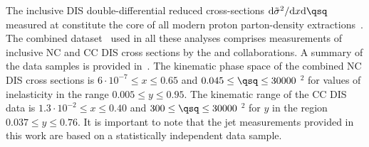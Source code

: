 The inclusive DIS double-differential reduced cross-sections $\mathrm{d}\tilde\sigma^2/\mathrm{d}x\mathrm{d}\qsq$ measured at \hera constitute the core of all modern proton parton-density extractions~\cite{Lai:2010vv,Martin:2009iq,Alekhin:2012ig,Ball:2011uy,Aaron:2009aa}. The combined dataset~\cite{Aaron:2009aa} used in all these analyses comprises measurements of inclusive NC and CC DIS cross sections by the \hone and \zeus collaborations. A summary of the data samples is provided in~\cite{Aaron:2009aa}. The kinematic phase space of the combined NC DIS cross sections is $6\cdot 10^{-7} \le x \le 0.65$ and $0.045 \le \qsq \le 30000$ \GeV$^2$ for values of inelasticity in the range $0.005 \le y \le 0.95$. The kinematic range of the CC DIS data is $1.3\cdot 10^{-2} \le x \le 0.40$ and $300 \le \qsq \le 30000$ \GeV$^2$ for $y$ in the region $0.037 \le y \le 0.76$. It is important to note that the jet measurements provided in this work are based on a statistically independent data sample.


